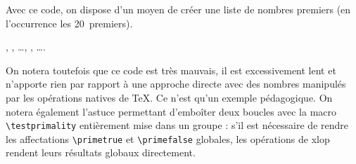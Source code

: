 \documentclass[12pt]{report}
\newcommand\package[1]{\textsf{#1}}
\begin{document}
Avec ce code, on dispose d'un moyen de créer une liste de nombres
premiers (en l'occurrence les 20~premiers).
\begin{SideBySideExample}
  , , \ldots,
  , \ldots {}.
\end{SideBySideExample}

On notera toutefois que ce code est très mauvais, il est excessivement
lent et n'apporte rien par rapport à une approche directe avec des
nombres manipulés par les opérations natives de \TeX{}. Ce n'est
qu'un exemple pédagogique. On notera également l'astuce permettant
d'emboîter deux boucles avec la macro \verb+\testprimality+
entièrement mise dans un groupe : s'il est nécessaire de rendre les
affectations \verb+\primetrue+ et \verb+\primefalse+ globales, les
opérations de \package{xlop} rendent leurs résultats globaux
directement.%
\end{document}
